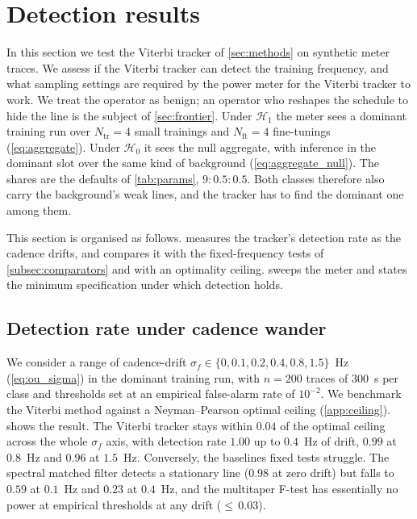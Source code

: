 \documentclass{article}
\begin{document}
\section{Detection results}
\label{sec:results}

In this section we test the Viterbi tracker of \cref{sec:methods} on synthetic
meter traces. We assess if the Viterbi tracker can detect the training frequency, and what sampling settings are required by the power meter for the Viterbi tracker to work. We treat the operator as benign; an operator who reshapes the schedule
to hide the line is the subject of \cref{sec:frontier}. Under $\mathcal{H}_1$ the meter sees a dominant training run over
$N_{\mathrm{tr}} = 4$ small trainings and $N_{\mathrm{ft}} = 4$ fine-tunings
(\cref{eq:aggregate}). Under $\mathcal{H}_0$ it sees the null aggregate, with
inference in the dominant slot over the same kind of background
(\cref{eq:aggregate_null}). The shares are the defaults of \cref{tab:params},
$9 : 0.5 : 0.5$. Both classes therefore also carry the background's weak lines, and
the tracker has to find the dominant one among them.

This section is organised as follows.  measures the
tracker's detection rate as the cadence drifts, and compares it with the
fixed-frequency tests of \cref{subsec:comparators} and with an optimality
ceiling.  sweeps the meter and states the minimum
specification under which detection holds.

\subsection{Detection rate under cadence wander}
\label{subsec:power}


We consider a range of cadence-drift  $\sigma_f \in \{0, 0.1, 0.2, 0.4, 0.8, 1.5\}$~Hz
(\cref{eq:ou_sigma}) in the dominant training run, with $n=200$ traces of
$300$~s per class and thresholds set at an empirical false-alarm rate of
$10^{-2}$. We benchmark the Viterbi method against a Neyman--Pearson optimal ceiling
(\cref{app:ceiling}).  shows the result. The Viterbi tracker stays within $0.04$ of the optimal ceiling across the
whole $\sigma_f$ axis, with detection rate $1.00$ up to $0.4$~Hz of drift, $0.99$ at
$0.8$~Hz and $0.96$ at $1.5$~Hz. Conversely, the baselines fixed tests struggle. The spectral matched
filter detects a stationary line ($0.98$ at zero drift) but falls to $0.59$ at
$0.1$~Hz and $0.23$ at $0.4$~Hz, and the multitaper F-test has essentially no
power at empirical thresholds at any drift (${\leq}\,0.03$). 
\end{document}
